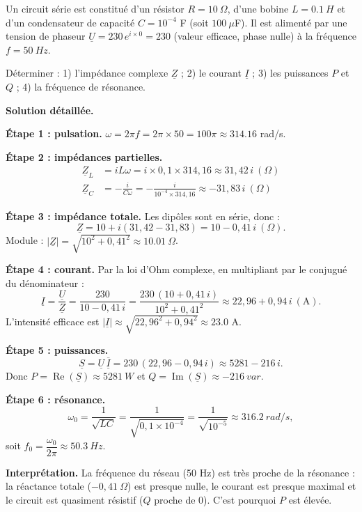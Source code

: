 \documentclass[11pt]{article}
\begin{document}
\begin{exoresolu}
Un circuit série est constitué d'un résistor $R = \SI{10}{\Omega}$, d'une bobine $L = \SI{0,1}{H}$ et d'un condensateur de capacité $C = 10^{-4}$ F (soit $100\ \mu$F). Il est alimenté par une tension de phaseur $\underline{U} = 230\,e^{i \times 0} = 230$ (valeur efficace, phase nulle) à la fréquence $f = \SI{50}{Hz}$.

Déterminer : 1) l'impédance complexe $\underline{Z}$ ; 2) le courant $\underline{I}$ ; 3) les puissances $P$ et $Q$ ; 4) la fréquence de résonance.

\tcblower
\textbf{Solution détaillée.}

\textbf{Étape 1 : pulsation.} $\omega = 2\pi f = 2\pi \times 50 = 100\pi \approx \num{314,16}$ rad/s.

\textbf{Étape 2 : impédances partielles.}
\begin{align*}
\underline{Z}_L &= iL\omega = i \times 0{,}1 \times 314{,}16 \approx 31{,}42\,i \ (\Omega)\\
\underline{Z}_C &= -\frac{i}{C\omega} = -\frac{i}{10^{-4} \times 314{,}16} \approx -31{,}83\,i \ (\Omega)
\end{align*}

\textbf{Étape 3 : impédance totale.} Les dipôles sont en série, donc :
\[ \underline{Z} = 10 + i(31{,}42 - 31{,}83) = 10 - 0{,}41\,i \ (\Omega). \]
Module : $|\underline{Z}| = \sqrt{10^2 + 0{,}41^2} \approx \num{10,01}\ \Omega$.

\textbf{Étape 4 : courant.} Par la loi d'Ohm complexe, en multipliant par le conjugué du dénominateur :
\[ \underline{I} = \frac{\underline{U}}{\underline{Z}} = \frac{230}{10 - 0{,}41\,i} = \frac{230\,(10 + 0{,}41\,i)}{10^2 + 0{,}41^2} \approx 22{,}96 + 0{,}94\,i \ (\text{A}). \]
L'intensité efficace est $|\underline{I}| \approx \sqrt{22{,}96^2 + 0{,}94^2} \approx \num{23,0}$ A.

\textbf{Étape 5 : puissances.}
\[ \underline{S} = \underline{U}\,\overline{\underline{I}} = 230\,(22{,}96 - 0{,}94\,i) \approx 5281 - 216\,i. \]
Donc $P = \operatorname{Re}(\underline{S}) \approx \SI{5281}{W}$ et $Q = \operatorname{Im}(\underline{S}) \approx \SI{-216}{var}$.

\textbf{Étape 6 : résonance.}
\[ \omega_0 = \frac{1}{\sqrt{LC}} = \frac{1}{\sqrt{0{,}1 \times 10^{-4}}} = \frac{1}{\sqrt{10^{-5}}} \approx \SI{316,2}{rad/s}, \]
soit $f_0 = \dfrac{\omega_0}{2\pi} \approx \SI{50,3}{Hz}$.

\textbf{Interprétation.} La fréquence du réseau (50 Hz) est très proche de la résonance : la réactance totale ($-0{,}41\ \Omega$) est presque nulle, le courant est presque maximal et le circuit est quasiment résistif ($Q$ proche de 0). C'est pourquoi $P$ est élevée.
\end{exoresolu}
\end{document}
